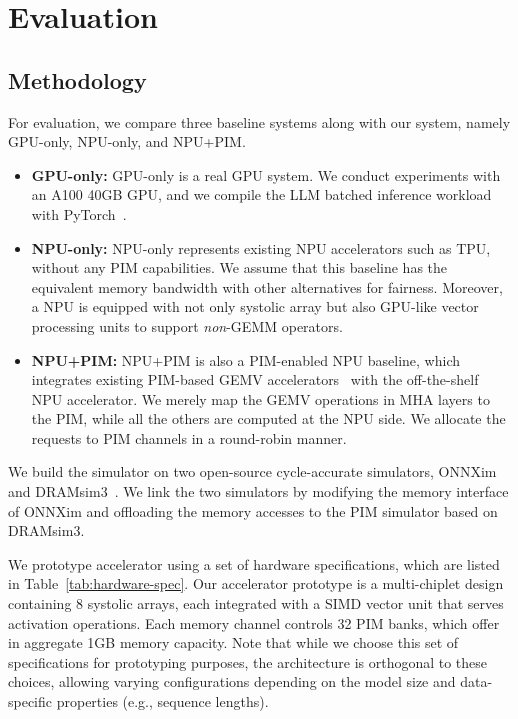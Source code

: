\section{Evaluation}
\label{sec:method}
%
\subsection{Methodology}

%
For evaluation, we compare three baseline systems along with our \neupims system, namely GPU-only, NPU-only, and NPU+PIM.
%
\begin{itemize}[labelindent=0.1em,nolistsep,leftmargin=1em]
    \item \textbf{\textsf{GPU-only}:}
    \textsf{GPU-only} is a real GPU system. We conduct experiments with an A100 40GB GPU, and we compile the LLM batched inference workload with PyTorch~\cite{pytorch}.
    
    \item \textbf{NPU-only:}
    NPU-only represents existing NPU accelerators such as TPU, without any PIM capabilities. 
    We assume that this baseline has the equivalent memory bandwidth with other alternatives for fairness. 
    Moreover, a NPU is equipped with not only systolic array but also GPU-like vector processing units to support \emph{non}-GEMM operators.  
    \item \textbf{NPU+PIM:}
    NPU+PIM is also a PIM-enabled NPU baseline, which integrates existing PIM-based GEMV accelerators~\cite{newton} with the off-the-shelf NPU accelerator. 
    We merely map the GEMV operations in MHA layers to the PIM, while all the others are computed at the NPU side.
    We allocate the requests to PIM channels in a round-robin manner.
\end{itemize}

We build the \neupims simulator on two open-source cycle-accurate simulators, ONNXim~\cite{onnxim} and DRAMsim3~\cite{dramsim3}. 
%
We link the two simulators by modifying the memory interface of ONNXim and offloading the memory accesses to the PIM simulator based on DRAMsim3.
%


%
%
We prototype \neupims accelerator using a set of hardware specifications, which are listed in Table~\ref{tab:hardware-spec}.
%
Our \neupims accelerator prototype is a multi-chiplet design containing 8 systolic arrays, each integrated with a SIMD vector unit that serves activation operations.
%
Each memory channel controls 32 PIM banks, which offer in aggregate 1GB memory capacity. 
%
Note that while we choose this set of specifications for prototyping purposes, the \neupims architecture is orthogonal to these choices, allowing varying configurations depending on the model size and data-specific properties (e.g., sequence lengths). 

